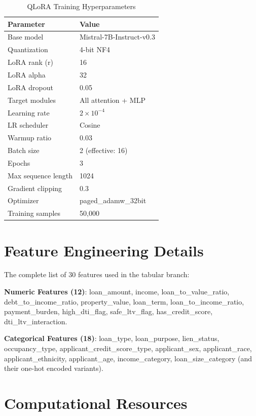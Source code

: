 \documentclass[11pt,a4paper]{article}
\begin{document}
\begin{table}[H]
\centering
\caption{QLoRA Training Hyperparameters}
\begin{tabular}{ll}
\toprule
\textbf{Parameter} & \textbf{Value} \\
\midrule
Base model & Mistral-7B-Instruct-v0.3 \\
Quantization & 4-bit NF4 \\
LoRA rank (r) & 16 \\
LoRA alpha & 32 \\
LoRA dropout & 0.05 \\
Target modules & All attention + MLP \\
Learning rate & $2 \times 10^{-4}$ \\
LR scheduler & Cosine \\
Warmup ratio & 0.03 \\
Batch size & 2 (effective: 16) \\
Epochs & 3 \\
Max sequence length & 1024 \\
Gradient clipping & 0.3 \\
Optimizer & paged\_adamw\_32bit \\
Training samples & 50,000 \\
\bottomrule
\end{tabular}
\end{table}

\section{Feature Engineering Details}

The complete list of 30 features used in the tabular branch:

\textbf{Numeric Features (12)}: loan\_amount, income, loan\_to\_value\_ratio, debt\_to\_income\_ratio, property\_value, loan\_term, loan\_to\_income\_ratio, payment\_burden, high\_dti\_flag, safe\_ltv\_flag, has\_credit\_score, dti\_ltv\_interaction.

\textbf{Categorical Features (18)}: loan\_type, loan\_purpose, lien\_status, occupancy\_type, applicant\_credit\_score\_type, applicant\_sex, applicant\_race, applicant\_ethnicity, applicant\_age, income\_category, loan\_size\_category (and their one-hot encoded variants).

\section{Computational Resources}
\end{document}
